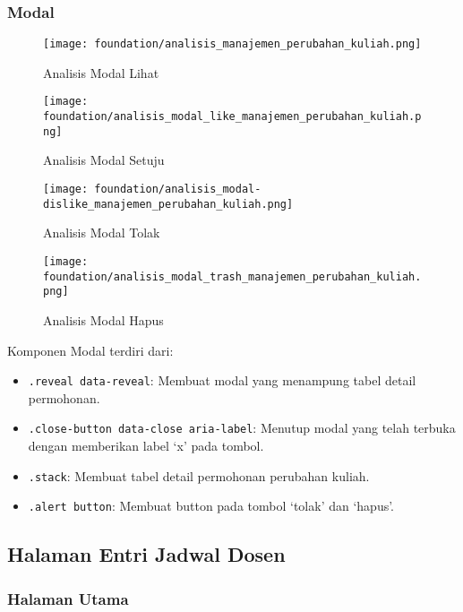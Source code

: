 \subsubsection{Modal}
\begin{figure} [H]
\centering  
\texttt{[image: foundation/analisis\_manajemen\_perubahan\_kuliah.png]}
\caption{Analisis Modal Lihat}
\end{figure}

\begin{figure} [H]
\centering  
\texttt{[image: foundation/analisis\_modal\_like\_manajemen\_perubahan\_kuliah.png]}
\caption{Analisis Modal Setuju}
\end{figure}

\begin{figure} [H]
\centering  
\texttt{[image: foundation/analisis\_modal-dislike\_manajemen\_perubahan\_kuliah.png]}
\caption{Analisis Modal Tolak}
\end{figure}

\begin{figure} [H]
\centering  
\texttt{[image: foundation/analisis\_modal\_trash\_manajemen\_perubahan\_kuliah.png]}
\caption{Analisis Modal Hapus}
\end{figure}
Komponen Modal terdiri dari:
\begin{itemize}
	\item \texttt{.reveal data-reveal}: Membuat modal yang menampung tabel detail permohonan.
	\item \texttt{.close-button data-close aria-label}: Menutup modal yang telah terbuka dengan memberikan label `x' pada tombol.
	\item \texttt{.stack}:	Membuat tabel detail permohonan perubahan kuliah.
	\item \texttt{.alert button}: Membuat button pada tombol `tolak'  dan `hapus'.
\end{itemize}



\subsection{Halaman Entri Jadwal Dosen}
\subsubsection{Halaman Utama}

